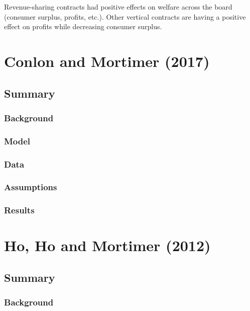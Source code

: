 Revenue-sharing contracts had positive effects on welfare across the board (consumer surplus, profits, etc.). Other vertical contracts are having a positive effect on profits while decreasing consumer surplus.

\section{Conlon and Mortimer (2017)}

\subsection{Summary}

\subsubsection{Background}



\subsubsection{Model}



\subsubsection{Data}



\subsubsection{Assumptions}



\subsubsection{Results}



\section{Ho, Ho and Mortimer (2012)}

\subsection{Summary}

\subsubsection{Background}



